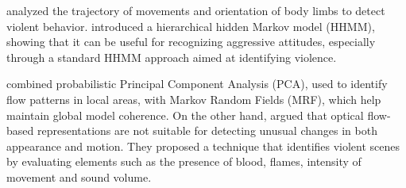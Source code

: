 \cite{Datta2002} analyzed the trajectory of movements and orientation of body limbs to detect violent behavior. \cite{Nguyen2005} introduced a hierarchical hidden Markov model (HHMM), showing that it can be useful for recognizing aggressive attitudes, especially through a standard HHMM approach aimed at identifying violence.

\cite{kim2009} combined probabilistic Principal Component Analysis (PCA), used to identify flow patterns in local areas, with Markov Random Fields (MRF), which help maintain global model coherence. On the other hand, \cite{Mahadevan2010} argued that optical flow-based representations are not suitable for detecting unusual changes in both appearance and motion. They proposed a technique that identifies violent scenes by evaluating elements such as the presence of blood, flames, intensity of movement and sound volume.

